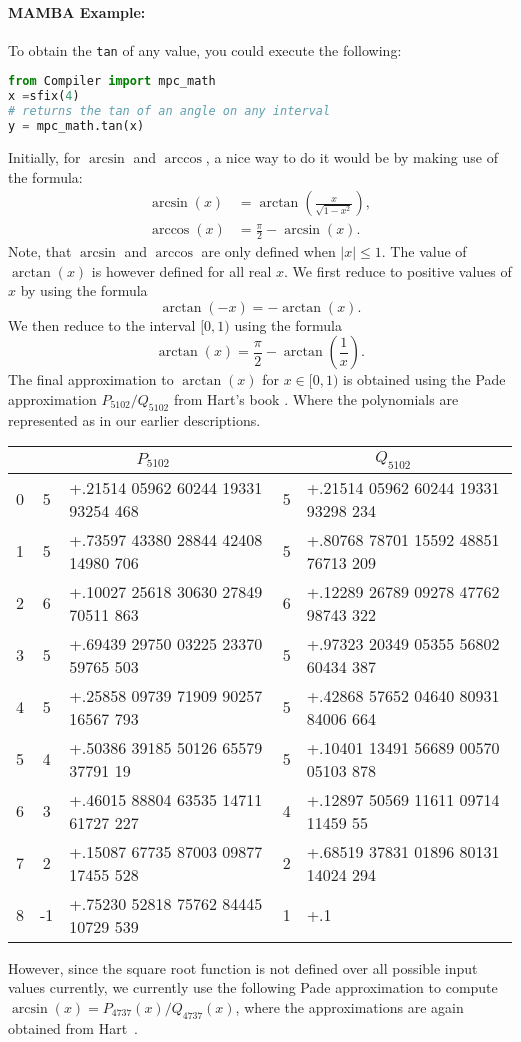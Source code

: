 \paragraph{MAMBA Example:} To obtain the \verb|tan| of any value, you could execute the following:
\begin{lstlisting}[language={python}]
from Compiler import mpc_math
x =sfix(4)
# returns the tan of an angle on any interval
y = mpc_math.tan(x)
\end{lstlisting}

Initially, for $\arcsin$ and $\arccos$, a nice way to do it would be by making use of the formula:
\begin{align*}
 \arcsin (x) &= \arctan \left( \frac{x}{\sqrt{1-x^2}} \right), \\
 \arccos (x) &= \frac{\pi}{2} - \arcsin (x). 
\end{align*}
Note, that $\arcsin$ and $\arccos$ are only defined when 
$|x|\le 1$.
The value of $\arctan(x)$ is however defined for all real $x$.
We first reduce to positive values of $x$ by using the formula
\[ \arctan(-x) = - \arctan(x). \]
We then reduce to the interval $[0,1)$ using the formula
\[ \arctan(x) = \frac{\pi}{2} - \arctan\left(\frac{1}{x} \right). \]
The final approximation to $\arctan(x)$ for $x \in [0,1)$
is obtained using the Pade approximation $P_{5102}/Q_{5102}$
from Hart's book \cite{Hart:1978:CA:540084}.
Where the polynomials are represented as in our earlier 
descriptions.
\begin{center}
\begin{tabular}{|c||c|l||c|l|}
\hline
& \multicolumn{2}{c||}{$P_{5102}$} & \multicolumn{2}{c|}{$Q_{5102}$}  \\
\hline
0  &  5  & +.21514 05962 60244 19331 93254 468 & 5 & +.21514 05962 60244 19331 93298 234 \\
1  &  5  & +.73597 43380 28844 42408 14980 706 & 5 & +.80768 78701 15592 48851 76713 209 \\
2  &  6  & +.10027 25618 30630 27849 70511 863 & 6 & +.12289 26789 09278 47762 98743 322 \\ 
3  &  5  & +.69439 29750 03225 23370 59765 503 & 5 & +.97323 20349 05355 56802 60434 387 \\
4  &  5  & +.25858 09739 71909 90257 16567 793 & 5 & +.42868 57652 04640 80931 84006 664 \\ 
5  &  4  & +.50386 39185 50126 65579 37791 19  & 5 & +.10401 13491 56689 00570 05103 878 \\ 
6  &  3  & +.46015 88804 63535 14711 61727 227 & 4 & +.12897 50569 11611 09714 11459 55  \\ 
7  &  2  & +.15087 67735 87003 09877 17455 528 & 2 & +.68519 37831 01896 80131 14024 294 \\
8  & -1  & +.75230 52818 75762 84445 10729 539 & 1 & +.1 \\
\hline
\end{tabular}
\end{center}
However, since the square root function is not defined over all possible
input values currently, we currently use 
the following Pade approximation to compute $\arcsin(x)= P_{4737}(x)/Q_{4737}(x)$,
where the approximations are again obtained from Hart~\cite{Hart:1978:CA:540084}.

